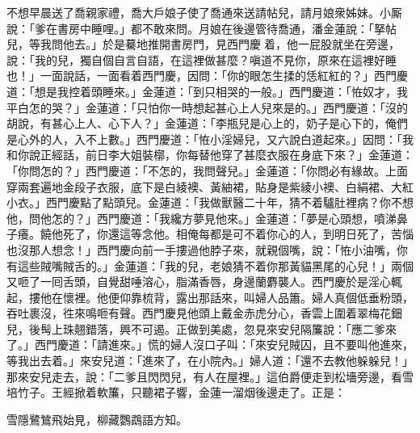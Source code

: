 不想早晨送了喬親家禮，喬大戶娘子使了喬通來送請帖兒，請月娘衆姊妹。小厮說：「爹在書房中睡哩。」都不敢來問。月娘在後邊管待喬通，潘金蓮說：「拏帖兒，等我問他去。」於是驀地推開書房門，見西門慶𢱉着，他一屁股就坐在旁邊，說：「我的兒，獨自個自言自語，在這裡做甚麼？嗔道不見你，原來在這裡好睡也！」一面說話，一面看着西門慶，因問：「你的眼怎生揉的恁紅紅的？」{}西門慶道：「想是我控着頭睡來。」金蓮道：「到只相哭的一般。」{}西門慶道：「恠奴才，我平白怎的哭？」金蓮道：「只怕你一時想起甚心上人兒來是的。」{}西門慶道：「沒的胡說，有甚心上人、心下人？」金蓮道：「李瓶兒是心上的，奶子是心下的，俺們是心外的人，入不上數。」西門慶道：「恠小淫婦兒，又六說白道起來。」因問：「我和你說正經話，前日李大姐裝槨，你每替他穿了甚麼衣服在身底下來？」金蓮道：「你問怎的？」西門慶道：「不怎的，我問聲兒。」金蓮道：「你問必有緣故。上面穿兩套遍地金段子衣服，底下是白綾襖、黃紬裙，貼身是紫綾小襖、白絹裙、大紅小衣。」西門慶點了點頭兒。金蓮道：「我做獸醫二十年，猜不着驢肚裡病？你不想他，問他怎的？」西門慶道：「我纔方夢見他來。」{}金蓮道：「夢是心頭想，噴涕鼻子癢。{}饒他死了，你還這等念他。相俺每都是可不着你心的人，到明日死了，苦惱也沒那人想念！」西門慶向前一手摟過他脖子來，就親個嘴，說：「恠小油嘴，你有這些賊嘴賊舌的。」金蓮道：「我的兒，老娘猜不着你那黃貓黑尾的心兒！」兩個又咂了一囘舌頭，自覺甜唾溶心，脂滿香唇，身邊蘭麝襲人。西門慶於是淫心輒起，摟他在懷裡。他便仰靠梳背，露出那話來，叫婦人品簫。婦人真個低垂粉頭，吞吐裹沒，徃來鳴咂有聲。西門慶見他頭上戴金赤虎分心，香雲上圍着翠梅花鈿兒，後髩上珠翹錯落，興不可遏。{}正做到美處，忽見來安兒隔簾說：「應二爹來了。」西門慶道：「請進來。」慌的婦人沒口子叫：「來安兒賊囚，且不要叫他進來，等我出去着。」來安兒道：「進來了，在小院內。」婦人道：「還不去教他躲躲兒！」那來安兒走去，說：「二爹且閃閃兒，有人在屋裡。」這伯爵便走到松墻旁邊，看雪培竹子。王經掀着軟簾，只聽裙子響，金蓮一溜烟後邊走了。正是：

\begin{myquote} 
雪隱鷺鷥飛始見，柳藏鸚鵡語方知。
\end{myquote} 

